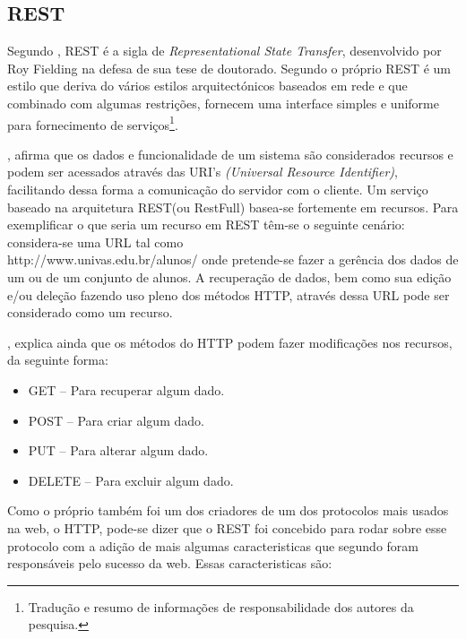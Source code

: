 	\subsection{REST}
	
	\par Segundo , REST é a sigla de
\textit{Representational State Transfer}, desenvolvido por Roy Fielding na
defesa de sua tese de doutorado. Segundo o próprio 
REST é um estilo que deriva do vários estilos arquitectónicos baseados em rede
e  que combinado com algumas restrições, fornecem uma interface simples e
uniforme para fornecimento de serviços\footnote{Tradução e resumo de
informações de responsabilidade dos autores da pesquisa.}.
	
	\par {}, afirma que os dados e funcionalidade de um sistema
são considerados recursos e podem ser acessados através das URI's
\textit{(Universal Resource Identifier)}, facilitando dessa forma a comunicação
do servidor com o cliente. Um serviço baseado na arquitetura REST(ou RestFull)
basea-se fortemente em recursos. Para exemplificar o que seria um recurso em
REST têm-se o seguinte cenário: considera-se uma URL tal como\\
http://www.univas.edu.br/alunos/ onde pretende-se fazer a gerência dos dados
de um ou de um conjunto de alunos. A recuperação de dados, bem como sua edição
e/ou deleção fazendo uso pleno dos métodos HTTP, através dessa URL pode ser
considerado como um recurso.
	\par {}, explica ainda que os métodos do HTTP podem fazer
modificações nos recursos, da seguinte forma:
	
	 \begin{itemize}
	   \item GET – Para recuperar algum dado. 
	   \item POST – Para criar algum dado.
	   \item PUT – Para alterar algum dado. 
	   \item DELETE – Para excluir algum dado. 
	 \end{itemize}
	 	
	\par Como o próprio  também foi um dos criadores de um
dos protocolos mais usados na web, o HTTP, pode-se dizer que o REST foi
concebido para rodar sobre esse protocolo com a adição de mais algumas
caracteristicas que segundo  foram responsáveis pelo
sucesso da web. Essas caracteristicas são:


